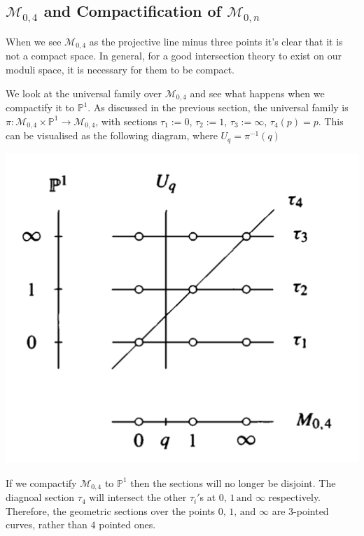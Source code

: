 \subsection{$\mathcal{M}_{0,4}$ and Compactification of $\mathcal{M}_{0,n}$}
When we see $\mathcal{M}_{0,4}$ as the projective line minus three points it's clear that it is not a compact space.
In general, for a good intersection theory to exist on our moduli space, it is necessary for them to be compact. 

\begin{example}
    \label{M04Example}
    We look at the universal family over $\mathcal{M}_{0,4}$ and see what happens when we compactify it to $\mathbb{P}^{1}$. 
    As discussed in the previous section, the universal family is $\pi :\mathcal{M}_{0,4} \times \mathbb{P}^{1} \to \mathcal{M}_{0,4}$, with sections $\tau_1 :=0$, $\tau_2 :=1$, $\tau_3 := \infty$, $\tau_4(p) = p$.
    This can be visualised as the following diagram, where $U_{q} = \pi^{-1}(q)$
    \begin{center}
    \includegraphics[scale = 0.3]{Chapters/Images/M_04_UniversalFam.png}
    \end{center}
    If we compactify $\mathcal{M}_{0,4}$ to $\mathbb{P}^{1}$ then the sections will no longer be disjoint.
    The diagnoal section $\tau_{4}$ will intersect the other $\tau_{i}'$s at $0,\,1\,\text{and }\infty$ respectively. 
    Therefore, the geometric sections over the points $0,\,1,\, \text{and }\infty$ are $3$-pointed curves, rather than $4$ pointed ones.

\end{example}
